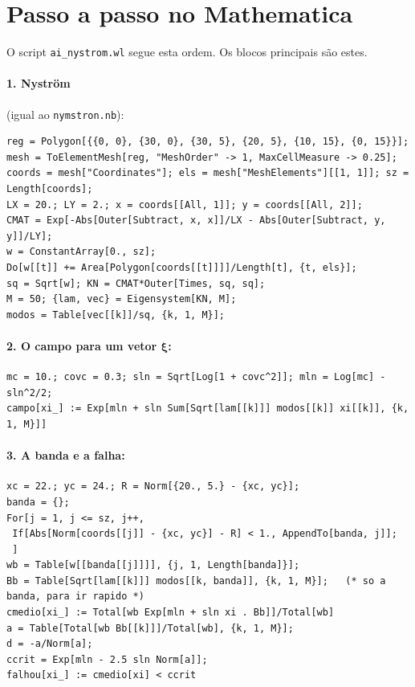 \documentclass[11pt,a4paper]{article}
\begin{document}
\section{Passo a passo no Mathematica}
O script \texttt{ai\_nystrom.wl} segue esta ordem. Os blocos principais são estes.

\paragraph{1. Nyström} (igual ao \texttt{nymstron.nb}):
\begin{lstlisting}
reg = Polygon[{{0, 0}, {30, 0}, {30, 5}, {20, 5}, {10, 15}, {0, 15}}];
mesh = ToElementMesh[reg, "MeshOrder" -> 1, MaxCellMeasure -> 0.25];
coords = mesh["Coordinates"]; els = mesh["MeshElements"][[1, 1]]; sz = Length[coords];
LX = 20.; LY = 2.; x = coords[[All, 1]]; y = coords[[All, 2]];
CMAT = Exp[-Abs[Outer[Subtract, x, x]]/LX - Abs[Outer[Subtract, y, y]]/LY];
w = ConstantArray[0., sz];
Do[w[[t]] += Area[Polygon[coords[[t]]]]/Length[t], {t, els}];
sq = Sqrt[w]; KN = CMAT*Outer[Times, sq, sq];
M = 50; {lam, vec} = Eigensystem[KN, M];
modos = Table[vec[[k]]/sq, {k, 1, M}];
\end{lstlisting}

\paragraph{2. O campo para um vetor $\bm\xi$:}
\begin{lstlisting}
mc = 10.; covc = 0.3; sln = Sqrt[Log[1 + covc^2]]; mln = Log[mc] - sln^2/2;
campo[xi_] := Exp[mln + sln Sum[Sqrt[lam[[k]]] modos[[k]] xi[[k]], {k, 1, M}]]
\end{lstlisting}

\paragraph{3. A banda e a falha:}
\begin{lstlisting}
xc = 22.; yc = 24.; R = Norm[{20., 5.} - {xc, yc}];
banda = {};
For[j = 1, j <= sz, j++,
 If[Abs[Norm[coords[[j]] - {xc, yc}] - R] < 1., AppendTo[banda, j]];
 ]
wb = Table[w[[banda[[j]]]], {j, 1, Length[banda]}];
Bb = Table[Sqrt[lam[[k]]] modos[[k, banda]], {k, 1, M}];   (* so a banda, para ir rapido *)
cmedio[xi_] := Total[wb Exp[mln + sln xi . Bb]]/Total[wb]
a = Table[Total[wb Bb[[k]]]/Total[wb], {k, 1, M}];
d = -a/Norm[a];
ccrit = Exp[mln - 2.5 sln Norm[a]];
falhou[xi_] := cmedio[xi] < ccrit
\end{lstlisting}
\end{document}
